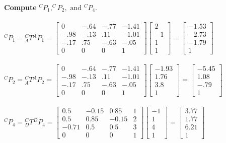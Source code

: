 \documentclass{article}
\begin{document}
\textbf{Compute} $^CP_1, ^CP_2, \text{ and } {} ^CP_4$.\\\\
$^CP_1={}^C_AT{}^AP_1=\begin{bmatrix}
0 & -.64 & -.77 & -1.41\\
-.98 & -.13 & .11 & -1.01\\
-.17 & .75 & -.63 & -.05\\
0 & 0 & 0 & 1
\end{bmatrix}\begin{bmatrix}
2\\
-1\\
1\\
1
\end{bmatrix}=\begin{bmatrix}
-1.53\\
-2.73\\
-1.79\\
1
\end{bmatrix}$\\\\
$^CP_2={}^C_AT{}^AP_2=\begin{bmatrix}
0 & -.64 & -.77 & -1.41\\
-.98 & -.13 & .11 & -1.01\\
-.17 & .75 & -.63 & -.05\\
0 & 0 & 0 & 1
\end{bmatrix}\begin{bmatrix}
-1.93\\
1.76\\
3.8\\
1
\end{bmatrix}=\begin{bmatrix}
-5.45\\
1.08\\
-.79\\
1
\end{bmatrix}$\\\\
$^CP_4={}^C_DT{}^DP_4=\begin{bmatrix}
0.5 & -0.15 & 0.85 & 1\\
0.5 & 0.85 & -0.15 & 2\\
-0.71 & 0.5 & 0.5 & 3\\
0 & 0 & 0 & 1
\end{bmatrix}\begin{bmatrix}
-1\\
1\\
4\\
1
\end{bmatrix}=\begin{bmatrix}
3.77\\
1.77\\
6.21\\
1
\end{bmatrix}$\\\\
\end{document}
